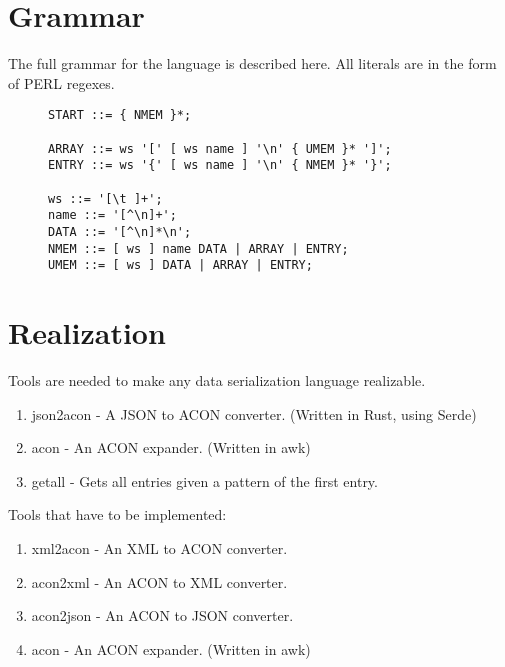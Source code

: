 \documentclass[listof=totoc]{article}
\begin{document}
\section{Grammar}
\noindent The full grammar for the language is described here. All literals are in the form of PERL regexes.


\begin{figure}[H]
\centering
\begin{varwidth}{\linewidth}
\begin{verbatim}
START ::= { NMEM }*;

ARRAY ::= ws '[' [ ws name ] '\n' { UMEM }* ']';
ENTRY ::= ws '{' [ ws name ] '\n' { NMEM }* '}';

ws ::= '[\t ]+';
name ::= '[^\n]+';
DATA ::= '[^\n]*\n';
NMEM ::= [ ws ] name DATA | ARRAY | ENTRY;
UMEM ::= [ ws ] DATA | ARRAY | ENTRY;

\end{verbatim}
\end{varwidth}
\caption{}
\end{figure}

\section{Realization}
\noindent Tools are needed to make any data serialization language realizable.

\begin{enumerate}
  \item json2acon - A JSON to ACON converter. (Written in Rust, using Serde)
  \item acon - An ACON expander. (Written in awk)
	\item getall - Gets all entries given a pattern of the first entry.
\end{enumerate}

\noindent Tools that have to be implemented:
\begin{enumerate}
  \item xml2acon - An XML to ACON converter.
  \item acon2xml - An ACON to XML converter.
  \item acon2json - An ACON to JSON converter.
  \item acon - An ACON expander. (Written in awk)
\end{enumerate}


\lstlistoflistings



\end{document}
